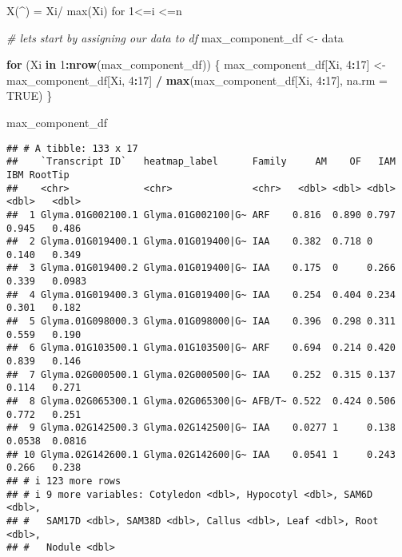 \documentclass[
]{article}
\newenvironment{Shaded}{\begin{snugshade}}{\end{snugshade}}
\newcommand{\AttributeTok}[1]{\textcolor[rgb]{0.13,0.29,0.53}{#1}}
\newcommand{\CommentTok}[1]{\textcolor[rgb]{0.56,0.35,0.01}{\textit{#1}}}
\newcommand{\ConstantTok}[1]{\textcolor[rgb]{0.56,0.35,0.01}{#1}}
\newcommand{\ControlFlowTok}[1]{\textcolor[rgb]{0.13,0.29,0.53}{\textbf{#1}}}
\newcommand{\DecValTok}[1]{\textcolor[rgb]{0.00,0.00,0.81}{#1}}
\newcommand{\FunctionTok}[1]{\textcolor[rgb]{0.13,0.29,0.53}{\textbf{#1}}}
\newcommand{\NormalTok}[1]{#1}
\newcommand{\OtherTok}[1]{\textcolor[rgb]{0.56,0.35,0.01}{#1}}
\newcommand{\SpecialCharTok}[1]{\textcolor[rgb]{0.81,0.36,0.00}{\textbf{#1}}}
\begin{document}
X(\^{}) = Xi/ max(Xi) for 1\textless=i \textless=n

\begin{Shaded}
\begin{Highlighting}[]
\CommentTok{\# lets start by assigning our data to df}
\NormalTok{max\_component\_df }\OtherTok{\textless{}{-}}\NormalTok{ data}

\ControlFlowTok{for}\NormalTok{ (Xi }\ControlFlowTok{in} \DecValTok{1}\SpecialCharTok{:}\FunctionTok{nrow}\NormalTok{(max\_component\_df)) \{}
\NormalTok{  max\_component\_df[Xi, }\DecValTok{4}\SpecialCharTok{:}\DecValTok{17}\NormalTok{] }\OtherTok{\textless{}{-}}\NormalTok{ max\_component\_df[Xi, }\DecValTok{4}\SpecialCharTok{:}\DecValTok{17}\NormalTok{] }\SpecialCharTok{/} \FunctionTok{max}\NormalTok{(max\_component\_df[Xi, }\DecValTok{4}\SpecialCharTok{:}\DecValTok{17}\NormalTok{], }\AttributeTok{na.rm =} \ConstantTok{TRUE}\NormalTok{)}
\NormalTok{\}}

\NormalTok{max\_component\_df}
\end{Highlighting}
\end{Shaded}

\begin{verbatim}
## # A tibble: 133 x 17
##    `Transcript ID`   heatmap_label      Family     AM    OF   IAM    IBM RootTip
##    <chr>             <chr>              <chr>   <dbl> <dbl> <dbl>  <dbl>   <dbl>
##  1 Glyma.01G002100.1 Glyma.01G002100|G~ ARF    0.816  0.890 0.797 0.945   0.486 
##  2 Glyma.01G019400.1 Glyma.01G019400|G~ IAA    0.382  0.718 0     0.140   0.349 
##  3 Glyma.01G019400.2 Glyma.01G019400|G~ IAA    0.175  0     0.266 0.339   0.0983
##  4 Glyma.01G019400.3 Glyma.01G019400|G~ IAA    0.254  0.404 0.234 0.301   0.182 
##  5 Glyma.01G098000.3 Glyma.01G098000|G~ IAA    0.396  0.298 0.311 0.559   0.190 
##  6 Glyma.01G103500.1 Glyma.01G103500|G~ ARF    0.694  0.214 0.420 0.839   0.146 
##  7 Glyma.02G000500.1 Glyma.02G000500|G~ IAA    0.252  0.315 0.137 0.114   0.271 
##  8 Glyma.02G065300.1 Glyma.02G065300|G~ AFB/T~ 0.522  0.424 0.506 0.772   0.251 
##  9 Glyma.02G142500.3 Glyma.02G142500|G~ IAA    0.0277 1     0.138 0.0538  0.0816
## 10 Glyma.02G142600.1 Glyma.02G142600|G~ IAA    0.0541 1     0.243 0.266   0.238 
## # i 123 more rows
## # i 9 more variables: Cotyledon <dbl>, Hypocotyl <dbl>, SAM6D <dbl>,
## #   SAM17D <dbl>, SAM38D <dbl>, Callus <dbl>, Leaf <dbl>, Root <dbl>,
## #   Nodule <dbl>
\end{verbatim}
\end{document}
